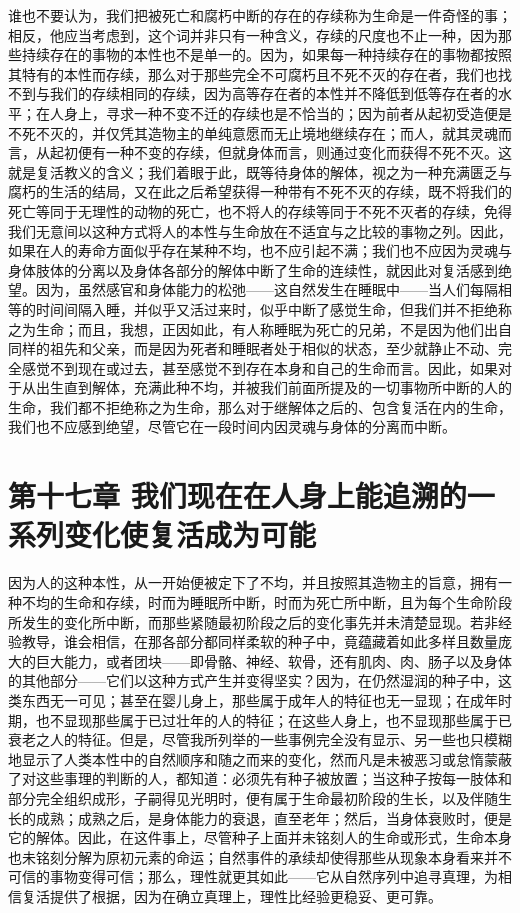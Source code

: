 谁也不要认为，我们把被死亡和腐朽中断的存在的存续称为生命是一件奇怪的事；相反，他应当考虑到，这个词并非只有一种含义，存续的尺度也不止一种，因为那些持续存在的事物的本性也不是单一的。因为，如果每一种持续存在的事物都按照其特有的本性而存续，那么对于那些完全不可腐朽且不死不灭的存在者，我们也找不到与我们的存续相同的存续，因为高等存在者的本性并不降低到低等存在者的水平；在人身上，寻求一种不变不迁的存续也是不恰当的；因为前者从起初受造便是不死不灭的，并仅凭其造物主的单纯意愿而无止境地继续存在；而人，就其灵魂而言，从起初便有一种不变的存续，但就身体而言，则通过变化而获得不死不灭。这就是复活教义的含义；我们着眼于此，既等待身体的解体，视之为一种充满匮乏与腐朽的生活的结局，又在此之后希望获得一种带有不死不灭的存续，既不将我们的死亡等同于无理性的动物的死亡，也不将人的存续等同于不死不灭者的存续，免得我们无意间以这种方式将人的本性与生命放在不适宜与之比较的事物之列。因此，如果在人的寿命方面似乎存在某种不均，也不应引起不满；我们也不应因为灵魂与身体肢体的分离以及身体各部分的解体中断了生命的连续性，就因此对复活感到绝望。因为，虽然感官和身体能力的松弛——这自然发生在睡眠中——当人们每隔相等的时间间隔入睡，并似乎又活过来时，似乎中断了感觉生命，但我们并不拒绝称之为生命；而且，我想，正因如此，有人称睡眠为死亡的兄弟，不是因为他们出自同样的祖先和父亲，而是因为死者和睡眠者处于相似的状态，至少就静止不动、完全感觉不到现在或过去，甚至感觉不到存在本身和自己的生命而言。因此，如果对于从出生直到解体，充满此种不均，并被我们前面所提及的一切事物所中断的人的生命，我们都不拒绝称之为生命，那么对于继解体之后的、包含复活在内的生命，我们也不应感到绝望，尽管它在一段时间内因灵魂与身体的分离而中断。\par


\section{第十七章 我们现在在人身上能追溯的一系列变化使复活成为可能}

因为人的这种本性，从一开始便被定下了不均，并且按照其造物主的旨意，拥有一种不均的生命和存续，时而为睡眠所中断，时而为死亡所中断，且为每个生命阶段所发生的变化所中断，而那些紧随最初阶段之后的变化事先并未清楚显现。若非经验教导，谁会相信，在那各部分都同样柔软的种子中，竟蕴藏着如此多样且数量庞大的巨大能力，或者团块——即骨骼、神经、软骨，还有肌肉、肉、肠子以及身体的其他部分——它们以这种方式产生并变得坚实？因为，在仍然湿润的种子中，这类东西无一可见；甚至在婴儿身上，那些属于成年人的特征也无一显现；在成年时期，也不显现那些属于已过壮年的人的特征；在这些人身上，也不显现那些属于已衰老之人的特征。但是，尽管我所列举的一些事例完全没有显示、另一些也只模糊地显示了人类本性中的自然顺序和随之而来的变化，然而凡是未被恶习或怠惰蒙蔽了对这些事理的判断的人，都知道：必须先有种子被放置；当这种子按每一肢体和部分完全组织成形，子嗣得见光明时，便有属于生命最初阶段的生长，以及伴随生长的成熟；成熟之后，是身体能力的衰退，直至老年；然后，当身体衰败时，便是它的解体。因此，在这件事上，尽管种子上面并未铭刻人的生命或形式，生命本身也未铭刻分解为原初元素的命运；自然事件的承续却使得那些从现象本身看来并不可信的事物变得可信；那么，理性就更其如此——它从自然序列中追寻真理，为相信复活提供了根据，因为在确立真理上，理性比经验更稳妥、更可靠。\par

